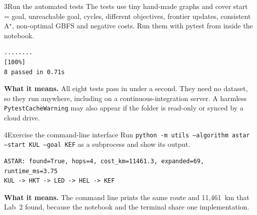 \begin{labquestion}{3}{Run the automated tests}
The tests use tiny hand-made graphs and cover start = goal, unreachable goal, cycles, different objectives, frontier updates, consistent A$^\star$, non-optimal GBFS and negative costs. Run them with pytest from inside the notebook.
\end{labquestion}
\begin{labanswer}

\begin{refoutput}
\begin{lstlisting}[style=utpterminal]
........                                                                 [100%]
8 passed in 0.71s
\end{lstlisting}
\end{refoutput}

\textbf{What it means.} All eight tests pass in under a second. They need no dataset, so they run anywhere, including on a continuous-integration server. A harmless \texttt{PytestCacheWarning} may also appear if the folder is read-only or synced by a cloud drive.
\end{labanswer}

\begin{labquestion}{4}{Exercise the command-line interface}
Run \texttt{python -m utils --algorithm astar --start KUL --goal KEF} as a subprocess and show its output.
\end{labquestion}
\begin{labanswer}

\begin{refoutput}
\begin{lstlisting}[style=utpterminal]
ASTAR: found=True, hops=4, cost_km=11461.3, expanded=69, runtime_ms=3.75
KUL -> HKT -> LED -> HEL -> KEF
\end{lstlisting}
\end{refoutput}

\textbf{What it means.} The command line prints the same route and 11,461~km that Lab~2 found, because the notebook and the terminal share one implementation.
\end{labanswer}

